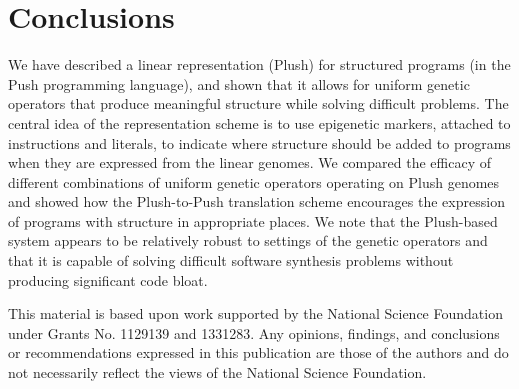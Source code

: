 \documentclass[graybox]{svmult}
\begin{document}


\section{Conclusions}

We have described a linear representation (Plush) for structured programs (in the Push programming language), and shown that it allows for uniform genetic operators that produce meaningful structure while solving difficult problems. The central idea of the representation scheme is to use epigenetic markers, attached to instructions and literals, to indicate where structure should be added to programs when they are expressed from the linear genomes. We compared the efficacy of different combinations of uniform genetic operators operating on Plush genomes and showed how the Plush-to-Push translation scheme encourages the expression of programs with structure in appropriate places. We note that the Plush-based system appears to be relatively robust to settings of the genetic operators and that it is capable of solving difficult software synthesis problems without producing significant code bloat.



\begin{acknowledgement}
This material is based upon work supported by the National Science Foundation under Grants No. 1129139 and 1331283. Any opinions, findings, and conclusions or recommendations expressed in this publication are those of the authors and do not necessarily reflect the views of the National Science Foundation.
\end{acknowledgement}


\end{document}
